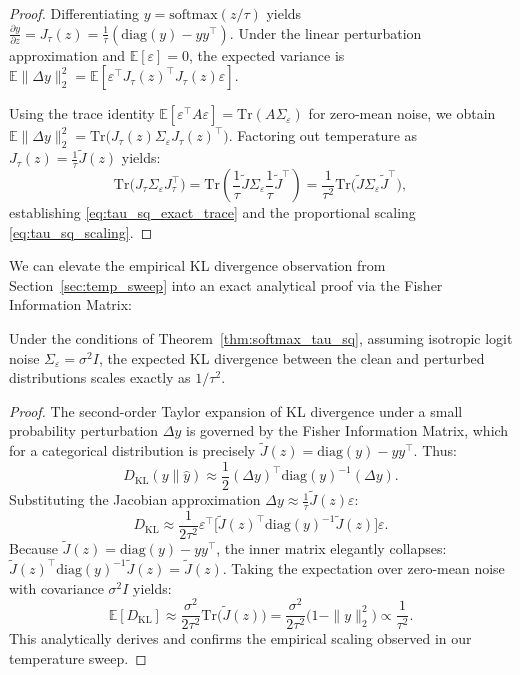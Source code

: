 \begin{proof}
Differentiating $y=\mathrm{softmax}(z/\tau)$ yields $\frac{\partial y}{\partial z} = J_\tau(z) = \frac{1}{\tau}\left(\mathrm{diag}(y) - yy^\top\right)$. Under the linear perturbation approximation and $\mathbb{E}[\varepsilon]=0$, the expected variance is $\mathbb{E}\|\Delta y\|_2^2 = \mathbb{E}[\varepsilon^\top J_\tau(z)^\top J_\tau(z)\varepsilon]$. 

Using the trace identity $\mathbb{E}[\varepsilon^\top A \varepsilon]=\mathrm{Tr}(A\Sigma_\varepsilon)$ for zero-mean noise, we obtain $\mathbb{E}\|\Delta y\|_2^2 = \mathrm{Tr}\!\big(J_\tau(z)\Sigma_\varepsilon J_\tau(z)^\top\big)$. Factoring out temperature as $J_\tau(z) = \frac{1}{\tau}\widetilde J(z)$ yields:
\[
\mathrm{Tr}\!\big(J_\tau \Sigma_\varepsilon J_\tau^\top\big)
=
\mathrm{Tr}\!\left(\frac{1}{\tau}\widetilde J \Sigma_\varepsilon \frac{1}{\tau}\widetilde J^\top\right)
=
\frac{1}{\tau^2}\mathrm{Tr}\!\big(\widetilde J \Sigma_\varepsilon \widetilde J^\top\big),
\]
establishing \eqref{eq:tau_sq_exact_trace} and the proportional scaling \eqref{eq:tau_sq_scaling}.
\end{proof}

We can elevate the empirical KL divergence observation from Section~\ref{sec:temp_sweep} into an exact analytical proof via the Fisher Information Matrix:

\begin{corollary}
\label{cor:kl_scaling}
Under the conditions of Theorem~\ref{thm:softmax_tau_sq}, assuming isotropic logit noise $\Sigma_\varepsilon = \sigma^2 I$, the expected KL divergence between the clean and perturbed distributions scales exactly as $1/\tau^2$.
\end{corollary}

\begin{proof}
The second-order Taylor expansion of KL divergence under a small probability perturbation $\Delta y$ is governed by the Fisher Information Matrix, which for a categorical distribution is precisely $\widetilde J(z) = \mathrm{diag}(y) - yy^\top$. Thus:
\[
D_{\mathrm{KL}}(y \parallel \hat{y}) \approx \frac{1}{2} (\Delta y)^\top \mathrm{diag}(y)^{-1} (\Delta y).
\]
Substituting the Jacobian approximation $\Delta y \approx \frac{1}{\tau}\widetilde J(z)\varepsilon$:
\[
D_{\mathrm{KL}} \approx \frac{1}{2\tau^2} \varepsilon^\top \Big[ \widetilde J(z)^\top \mathrm{diag}(y)^{-1} \widetilde J(z) \Big] \varepsilon.
\]
Because $\widetilde J(z) = \mathrm{diag}(y) - yy^\top$, the inner matrix elegantly collapses: $\widetilde J(z)^\top \mathrm{diag}(y)^{-1} \widetilde J(z) = \widetilde J(z)$. Taking the expectation over zero-mean noise with covariance $\sigma^2 I$ yields:
\[
\mathbb{E}[D_{\mathrm{KL}}] \approx \frac{\sigma^2}{2\tau^2} \mathrm{Tr}\big(\widetilde J(z)\big) = \frac{\sigma^2}{2\tau^2} \Big(1 - \|y\|_2^2\Big) \propto \frac{1}{\tau^2}.
\]
This analytically derives and confirms the empirical scaling observed in our temperature sweep.
\end{proof}

